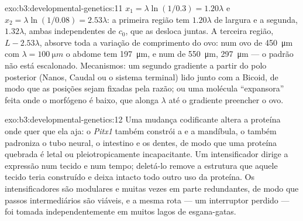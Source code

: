 \begin{solution}{exo:b3:developmental-genetics:11}
$x_{1} = \lambda\ln(1/0.3) = 1.20\lambda$ e $x_{2} = \lambda\ln(1/0.08)
= 2.53\lambda$: a primeira região tem $1.20\lambda$ de largura e a
segunda, $1.32\lambda$, ambas independentes de $c_{0}$, que as desloca
juntas. A terceira região, $L - 2.53\lambda$, absorve toda a variação de
comprimento do ovo: num ovo de \qty{450}{\micro m} com $\lambda = \qty{100}{\micro m}$ o abdome tem \qty{197}{\micro m}, e num de
\qty{550}{\micro m}, \qty{297}{\micro m} --- o padrão não está
escalonado. Mecanismos: um segundo gradiente a partir do polo posterior
(Nanos, Caudal ou o sistema terminal) lido junto com a Bicoid, de modo
que as posições sejam fixadas pela razão; ou uma molécula ``expansora''
feita onde o morfógeno é baixo, que alonga $\lambda$ até o gradiente
preencher o ovo.
\end{solution}

\begin{solution}{exo:b3:developmental-genetics:12}
Uma mudança codificante altera a proteína onde quer que ela aja: o
\emph{Pitx1} também constrói a  e a mandíbula, o \emph{} também padroniza o tubo neural, o intestino e os dentes, de
modo que uma proteína quebrada é letal ou pleiotropicamente
incapacitante. Um intensificador dirige a expressão num tecido e num
tempo; deletá-lo remove a estrutura que aquele tecido teria construído e
deixa intacto todo outro uso da proteína. Os intensificadores são
modulares e muitas vezes em parte redundantes, de modo que passos
intermediários são viáveis, e a mesma rota --- um interruptor perdido ---
foi tomada independentemente em muitos lagos de esgana-gatas.
\end{solution}

